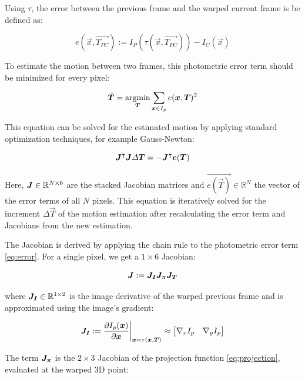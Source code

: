 
Using $\tau$, the error between the previous frame and the warped current frame is be defined as:

\begin{equation}
    \label{eq:error}
    e(\vec{x}, \vec{T_{PC}}) := I_P(\tau(\vec{x}, \vec{T_{PC}})) - I_C(\vec{x})
\end{equation}


To estimate the motion between two frames, this photometric error term should
be minimized for every pixel:

\begin{equation}
    \vec{\hat{T}} = \operatornamewithlimits{argmin}_{\vec{T}} \sum_{\vec{x} \in I_p} e(\vec{x}, \vec{T})^2
\end{equation}


This equation can be solved for the estimated motion by applying standard
optimization techniques, for example Gauss-Newton:

\begin{equation}
    \mat{J}^\intercal \mat{J} \Delta \vec{T} = - \mat{J}^\intercal \vec{e(\vec{T})}
\end{equation}

Here, $\mat{J} \in \mathbb{R}^{N \times 6}$ are the stacked Jacobian matrices
and $\vec{e(\vec{T})} \in \mathbb{R}^N$ the vector of the error terms of all
$N$ pixels.  This equation is iteratively solved for the increment $\Delta
\vec{T}$ of the motion estimation after recalculating the error term and
Jacobians from the new estimation.

The Jacobian is derived by applying the chain rule to the photometric error term \ref{eq:error}.
For a single pixel, we get a $1 \times 6$ Jacobian:

\begin{equation}
    \mat{J} := \mat{J_I} \mat{J_{\pi}} \mat{J_T}
\end{equation}

where $\mat{J_I} \in \mathbb{R}^{1 \times 2}$ is the image derivative of the warped previous frame and is
approximated using the image's gradient:

\begin{equation}
    \mat{J_I} := \frac{\partial I_p(\vec{x})} {\partial \vec{x}} \bigg|_{\vec{x} = \tau(\vec{x}, \vec{T})}
    \approx
    \begin{bmatrix}
        \nabla{}_x I_p & \nabla{}_y I_p
    \end{bmatrix}
\end{equation}

The term $\mat{J_{\pi}}$ is the $2 \times 3$ Jacobian of the projection
function \ref{eq:projection}, evaluated at the warped 3D point:

